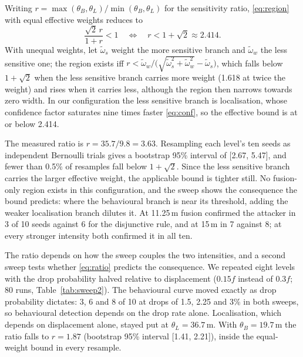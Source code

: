 Writing $r = \max(\theta_B,\theta_L)/\min(\theta_B,\theta_L)$ for the
sensitivity ratio, \eqref{eq:region} with equal effective weights reduces to
\begin{equation}
\label{eq:ratio}
\frac{\sqrt{2}\,r}{1+r} < 1
\quad\Longleftrightarrow\quad
r < 1 + \sqrt{2} \approx 2.414 .
\end{equation}
With unequal weights, let $\tilde\omega_s$ weight the more sensitive branch
and $\tilde\omega_w$ the less sensitive one; the region exists iff
$r < \tilde\omega_w / \bigl(\sqrt{\tilde\omega_s^2 + \tilde\omega_w^2} -
\tilde\omega_s\bigr)$, which falls below $1+\sqrt{2}$ when the less
sensitive branch carries more weight (1.618 at twice the weight) and rises
when it carries less, although the region then narrows towards zero width.
In our configuration the less sensitive branch is localisation, whose
confidence factor saturates nine times faster \eqref{eq:conf}, so the
effective bound is at or below 2.414.

The measured ratio is $r = 35.7/9.8 = 3.63$. Resampling each level's ten
seeds as independent Bernoulli trials gives a bootstrap 95\% interval of
[2.67, 5.47], and fewer than 0.5\% of resamples fall below $1+\sqrt{2}$.
Since the less sensitive branch carries the larger effective weight, the
applicable bound is tighter still. No fusion-only region exists in this
configuration, and the sweep shows the consequence the bound predicts:
where the behavioural branch is near its threshold, adding the weaker
localisation branch dilutes it. At 11.25\,m fusion confirmed the attacker in
3 of 10 seeds against 6 for the disjunctive rule, and at 15\,m in 7 against
8; at every stronger intensity both confirmed it in all ten.

The ratio depends on how the sweep couples the two intensities, and a
second sweep tests whether \eqref{eq:ratio} predicts the consequence. We
repeated eight levels with the drop probability halved relative to
displacement ($0.15f$ instead of $0.3f$; 80 runs, Table~\ref{tab:sweep2}).
The behavioural curve moved exactly as drop probability dictates: 3, 6 and
8 of 10 at drops of 1.5, 2.25 and 3\% in both sweeps, so behavioural
detection depends on the drop rate alone. Localisation, which depends on
displacement alone, stayed put at $\theta_L = 36.7$\,m. With
$\theta_B = 19.7$\,m the ratio falls to $r = 1.87$ (bootstrap 95\%
interval [1.41, 2.21]), inside the equal-weight bound in every resample.

